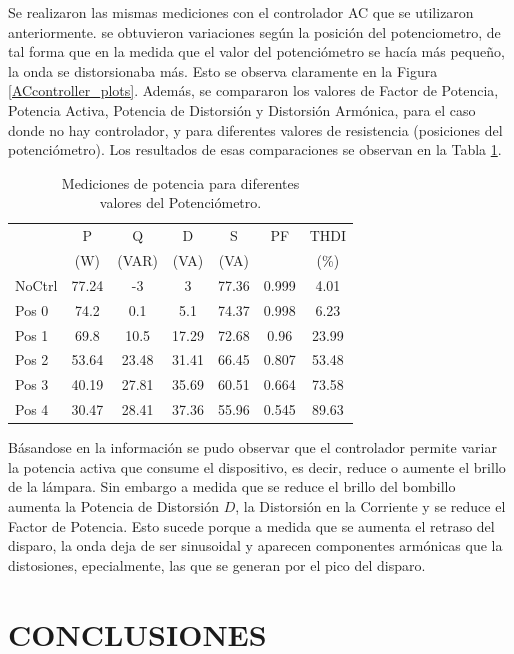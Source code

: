 \documentclass[journal]{IEEEtran}
\begin{document}
Se realizaron las mismas mediciones con el controlador AC 
que se utilizaron anteriormente. se obtuvieron variaciones 
según la posición del potenciometro, de tal forma que en 
la medida que el valor del potenciómetro se hacía más
pequeño, la onda se distorsionaba más. Esto se observa 
claramente en la Figura \ref{ACcontroller_plots}. 
Además, se compararon los valores de
Factor de Potencia, Potencia Activa, Potencia de Distorsión
y Distorsión Armónica, para el caso donde no hay controlador, 
y para diferentes valores de resistencia (posiciones del 
potenciómetro). Los resultados 
de esas comparaciones se observan en la Tabla 
\ref{table:controller}. \\


\begin{table}[h]
\begin{tabular}{|p{1.2cm}|c|c|c|c|c|c|}
\hline 
 & P  & Q  & D  & S  & PF & THDI  \\
 &(W) & (VAR) &(VA) & (VA) &  & (\%) \\ \hline  
NoCtrl & 77.24 & -3 & 3 & 77.36 & 0.999 & 4.01 \\ 
\hline 
Pos 0 & 74.2 & 0.1 & 5.1 & 74.37 & 0.998 & 6.23 \\ 
\hline 
Pos 1 & 69.8 & 10.5 & 17.29 & 72.68 & 0.96 & 23.99 \\
\hline 
Pos 2 & 53.64 & 23.48 & 31.41 & 66.45 & 0.807 & 53.48 \\
\hline 
Pos 3 & 40.19 & 27.81 & 35.69 & 60.51 & 0.664 & 73.58 \\ 
\hline
Pos 4 & 30.47 & 28.41 & 37.36 & 55.96 & 0.545 & 89.63 \\ 
\hline 
\end{tabular}
\caption{Mediciones de potencia para diferentes \\ valores 
del Potenciómetro.}
\label{table:controller}
\end{table}

Básandose en la información se pudo observar que el 
controlador permite variar la potencia activa que 
consume el dispositivo, es decir, reduce o aumente 
el brillo de la lámpara. Sin embargo a medida que se 
reduce el brillo del bombillo aumenta la Potencia de 
Distorsión $D$, la Distorsión en la Corriente y se 
reduce el Factor de Potencia. Esto sucede porque a
medida que se aumenta el retraso del disparo, la onda 
deja de ser sinusoidal y aparecen componentes armónicas 
que la distosiones, epecialmente, las que se 
generan por el pico del disparo. 

\section{CONCLUSIONES}
\end{document}
